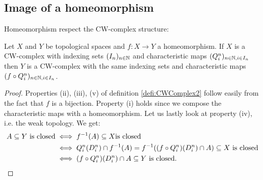 \subsection{Image of a homeomorphism}

Homeomorphism respect the CW-complex structure: 

\begin{lem}
    Let $X$ and $Y$ be topological spaces and $f \colon X \to Y$ a homeomorphism. 
    If $X$ is a CW-complex with indexing sets $(I_n)_{n \in \mathbb{N}}$ and characteristic maps $(Q_i^n)_{n \in \mathbb{N}, i \in I_n}$ then $Y$ is a CW-complex with the same indexing sets and characteristic maps $(f \circ Q_i^n)_{n \in \mathbb{N}, i \in I_n}$.
\end{lem}
\begin{proof}
    Properties (ii), (iii), (v) of definition \ref{defi:CWComplex2} follow easily from the fact that $f$ is a bijection. 
    Property (i) holds since we compose the characteristic maps with a homeomorphism. 
    Let us lastly look at property (iv), i.e. the weak topology. 
    We get: 
    \begin{equation*}
        \begin{split}
            A \subseteq Y \text{ is closed} &\iff f^{-1}(A) \subseteq X \text {is closed} \\
            &\iff Q_i^n(D_i^n) \cap f^{-1}(A) = f^{-1}((f \circ Q_i^n)(D_i^n) \cap A) \subseteq X \text{ is closed} \\ 
            &\iff (f \circ Q_i^n)(D_i^n) \cap A \subseteq Y \text{ is closed}.
        \end{split}
    \end{equation*}
\end{proof}